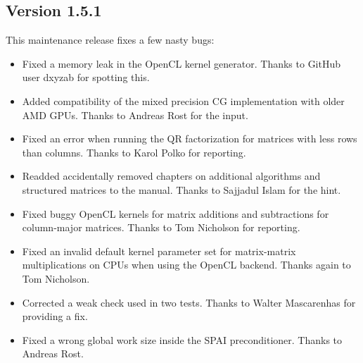 \subsection*{Version 1.5.1}
This maintenance release fixes a few nasty bugs:
\begin{itemize}
 \item Fixed a memory leak in the OpenCL kernel generator. Thanks to GitHub user dxyzab for spotting this.
 \item Added compatibility of the mixed precision CG implementation with older AMD GPUs. Thanks to Andreas Rost for the input.
 \item Fixed an error when running the QR factorization for matrices with less rows than columns. Thanks to Karol Polko for reporting.
 \item Readded accidentally removed chapters on additional algorithms and structured matrices to the manual. Thanks to Sajjadul Islam for the hint.
 \item Fixed buggy OpenCL kernels for matrix additions and subtractions for column-major matrices. Thanks to Tom Nicholson for reporting.
 \item Fixed an invalid default kernel parameter set for matrix-matrix multiplications on CPUs when using the OpenCL backend. Thanks again to Tom Nicholson.
 \item Corrected a weak check used in two tests. Thanks to Walter Mascarenhas for providing a fix.
 \item Fixed a wrong global work size inside the SPAI preconditioner. Thanks to Andreas Rost.
\end{itemize}

